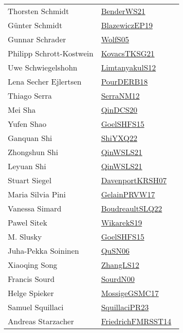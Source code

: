 {\begin{longtable}{p{4cm}p{20cm}}
Thorsten Schmidt & \href{works/BenderWS21.pdf}{BenderWS21}~\cite{BenderWS21}\\
Günter Schmidt & \href{}{BlazewiczEP19}~\cite{BlazewiczEP19}\\
Gunnar Schrader & \href{works/WolfS05.pdf}{WolfS05}~\cite{WolfS05}\\
Philipp Schrott{-}Kostwein & \href{works/KovacsTKSG21.pdf}{KovacsTKSG21}~\cite{KovacsTKSG21}\\
Uwe Schwiegelshohn & \href{works/LimtanyakulS12.pdf}{LimtanyakulS12}~\cite{LimtanyakulS12}\\
Lena Secher Ejlertsen & \href{works/PourDERB18.pdf}{PourDERB18}~\cite{PourDERB18}\\
Thiago Serra & \href{works/SerraNM12.pdf}{SerraNM12}~\cite{SerraNM12}\\
Mei Sha & \href{works/QinDCS20.pdf}{QinDCS20}~\cite{QinDCS20}\\
Yufen Shao & \href{works/GoelSHFS15.pdf}{GoelSHFS15}~\cite{GoelSHFS15}\\
Ganquan Shi & \href{}{ShiYXQ22}~\cite{ShiYXQ22}\\
Zhongshun Shi & \href{works/QinWSLS21.pdf}{QinWSLS21}~\cite{QinWSLS21}\\
Leyuan Shi & \href{works/QinWSLS21.pdf}{QinWSLS21}~\cite{QinWSLS21}\\
Stuart Siegel & \href{works/DavenportKRSH07.pdf}{DavenportKRSH07}~\cite{DavenportKRSH07}\\
Maria Silvia Pini & \href{works/GelainPRVW17.pdf}{GelainPRVW17}~\cite{GelainPRVW17}\\
Vanessa Simard & \href{works/BoudreaultSLQ22.pdf}{BoudreaultSLQ22}~\cite{BoudreaultSLQ22}\\
Pawel Sitek & \href{works/WikarekS19.pdf}{WikarekS19}~\cite{WikarekS19}\\
M. Slusky & \href{works/GoelSHFS15.pdf}{GoelSHFS15}~\cite{GoelSHFS15}\\
Juha{-}Pekka Soininen & \href{works/QuSN06.pdf}{QuSN06}~\cite{QuSN06}\\
Xiaoqing Song & \href{works/ZhangLS12.pdf}{ZhangLS12}~\cite{ZhangLS12}\\
Francis Sourd & \href{works/SourdN00.pdf}{SourdN00}~\cite{SourdN00}\\
Helge Spieker & \href{works/MossigeGSMC17.pdf}{MossigeGSMC17}~\cite{MossigeGSMC17}\\
Samuel Squillaci & \href{works/SquillaciPR23.pdf}{SquillaciPR23}~\cite{SquillaciPR23}\\
Andreas Starzacher & \href{}{FriedrichFMRSST14}~\cite{FriedrichFMRSST14}\\

\end{longtable}}

